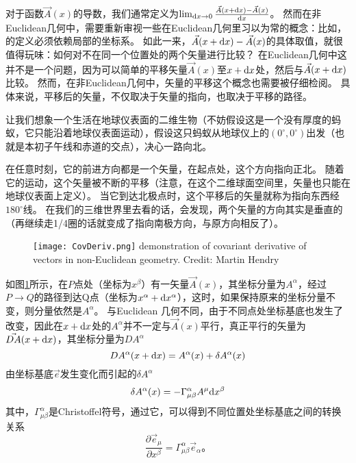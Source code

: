 对于函数$\vec{A}(x)$的导数，我们通常定义为$\lim_{{\rm d}x \to 0}\frac{\vec{A}(x+{\rm d}x)-\vec{A}(x)}{{\rm d}x}$。
然而在非Euclidean几何中，需要重新审视一些在Euclidean几何里习以为常的概念：比如，{}的定义必须依赖局部的坐标系。
如此一来，$\vec{A}(x+{\rm d}x)-\vec{A}(x)$的具体取值，就很值得玩味：如何对不在同一个位置处的两个矢量进行比较？
在Euclidean几何中这并不是一个问题，因为可以简单的平移矢量$\vec{A}(x)$至$x+{\rm d}x$处，然后与$\vec{A}(x+{\rm d}x)$比较。
然而，在非Euclidean几何中，矢量的平移这个概念也需要被仔细检阅。
具体来说，平移后的矢量，不仅取决于矢量的指向，也取决于平移的路径。

\begin{example}

让我们想象一个生活在地球仪表面的二维生物（不妨假设这是一个没有厚度的蚂蚁，它只能沿着地球仪表面运动），假设这只蚂蚁从地球仪上的$(0^\circ,0^\circ)$出发（也就是本初子午线和赤道的交点），决心一路向北。

在任意时刻，它的前进方向都是一个矢量，在起点处，这个方向指向正北。
随着它的运动，这个矢量被不断的平移（注意，在这个二维球面空间里，矢量也只能在地球仪表面上定义）。
当它到达北极点时，这个平移后的矢量就称为指向东西经$180^\circ$线。
在我们的三维世界里去看的话，会发现，两个矢量的方向其实是垂直的（再继续走1/4圈的话就变成了指向南极方向，与原方向相反了）。
\end{example}

\begin{figure}[htp]
\centering
\texttt{[image: CovDeriv.png]}
  {demonstration of covariant derivative of vectors in non-Euclidean geometry. Credit: Martin Hendry}
\label{fig:CovDeriv}
\end{figure}

如图\ref{fig:CovDeriv}所示，在$P$点处（坐标为$x^\beta$）有一矢量$\vec{A}(x)$，其坐标分量为$A^\alpha$，经过$P \to Q$的路径到达Q点（坐标为$x^\alpha+{\rm d}x^\alpha$），这时，如果保持原来的坐标分量不变，则分量依然是$A^\alpha$。
与Euclidean 几何不同，由于不同点处坐标基底也发生了改变，因此在$x+{\rm d}x$处的$A^\alpha$并不一定与$\vec{A}(x)$平行，真正平行的矢量为$\vec{DA}(x+{\rm d}x)$，其坐标分量为$DA^\alpha$
\begin{equation}\label{eq:parallel}
  DA^\alpha(x+{\rm d}x) = A^\alpha(x) + \delta A^\alpha(x)
\end{equation}
由坐标基底$\vec{e}$发生变化而引起的$\delta A^\alpha$
\begin{equation}\label{eq:deltaA}
  \delta A^\alpha(x) = -\Gamma^\alpha_{\mu\beta} A^\mu {\rm d}x^\beta
\end{equation}
其中，$\Gamma^\alpha_{\mu\beta}$是Christoffel符号，通过它，可以得到不同位置处坐标基底之间的转换关系
\begin{equation}\label{eq:Christoffel}
\frac{\partial \vec{e}_\mu}{\partial x^\beta} = \Gamma^\alpha_{\mu\beta} \vec{e}_\alpha。
\end{equation}

